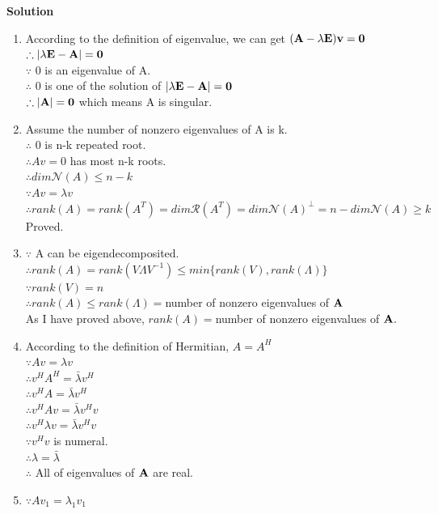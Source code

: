 \documentclass[english,onecolumn]{IEEEtran}
\newcommand{\bA}{{\bf A}}
\begin{document}
\noindent
\textbf{Solution}
\begin{enumerate}
    \item
    	According to the definition of eigenvalue, we can get $(\bf{A}-\lambda \bf{E})v=0$\\
			$\therefore |\lambda \bf{E}-\bf{A}|=0$\\
			$\because $ 0 is an eigenvalue of A.\\
			$\therefore$ 0 is one of the solution of $|\lambda \bf{E}-\bf{A}|=0$\\
			$\therefore |\bf{A}|=0$ which means A is singular.
    \item
    	Assume the number of nonzero eigenvalues of A is k.\\
    	$\therefore$ 0 is n-k repeated root.\\
    	$\therefore Av=0$ has most n-k roots.\\
    	$\therefore dim\mathcal{N}(A)\leq n-k$\\
    	$\because Av=\lambda v$\\
    	$\therefore rank(A)=rank(A^T)=dim\mathcal{R}(A^T)=dim\mathcal{N}(A)^{\perp}=n-dim\mathcal{N}(A)\geq k$\\
    	Proved.
    \item
    	$\because $ A can be eigendecomposited.\\
    	$\therefore rank(A)=rank(V\Lambda V^{-1})\leq min\{rank(V),rank(\Lambda)\}$\\
    	$\because rank(V)=n$\\
    	$\therefore rank(A)\leq rank(\Lambda)=$number of nonzero eigenvalues of ${\bf A}$\\
    	As I have proved above, $rank(A)=$number of nonzero eigenvalues of ${\bf A}.$
    \item 
    	According to the definition of Hermitian, $A=A^H$\\
			$\because Av=\lambda v$\\
			$\therefore v^HA^H=\bar{\lambda}v^H$\\
			$\therefore v^HA=\bar{\lambda}v^H $\\
			$\therefore v^HAv=\bar{\lambda}v^Hv$\\
			$\therefore v^H\lambda v=\bar{\lambda}v^Hv$\\
			$\because v^Hv$ is numeral.\\
			$\therefore \lambda=\bar{\lambda}$\\
			$\therefore$ All of eigenvalues of $\bA$ are real.			
    \item 
    	$\because Av_1=\lambda_1v_1$\\

\end{enumerate}
\end{document}
